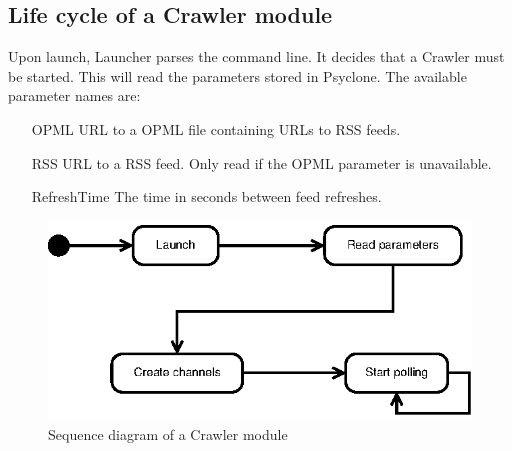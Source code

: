 \subsection{Life cycle of a Crawler module}

Upon launch, Launcher parses the command line. It decides that a Crawler must
be started. This will read the parameters stored in Psyclone. The available parameter names are:

\begin{itemize}
 \item[OPML] URL to a OPML file containing URLs to RSS feeds.
 \item[RSS] URL to a RSS feed. Only read if the OPML parameter is unavailable.
 \item[RefreshTime] The time in seconds between feed refreshes.
\end{itemize}

\begin{figure}[htp]
  \centering
  \includegraphics{image/sequence-diagram-crawler}
  \caption{Sequence diagram of a Crawler module}
\end{figure}
